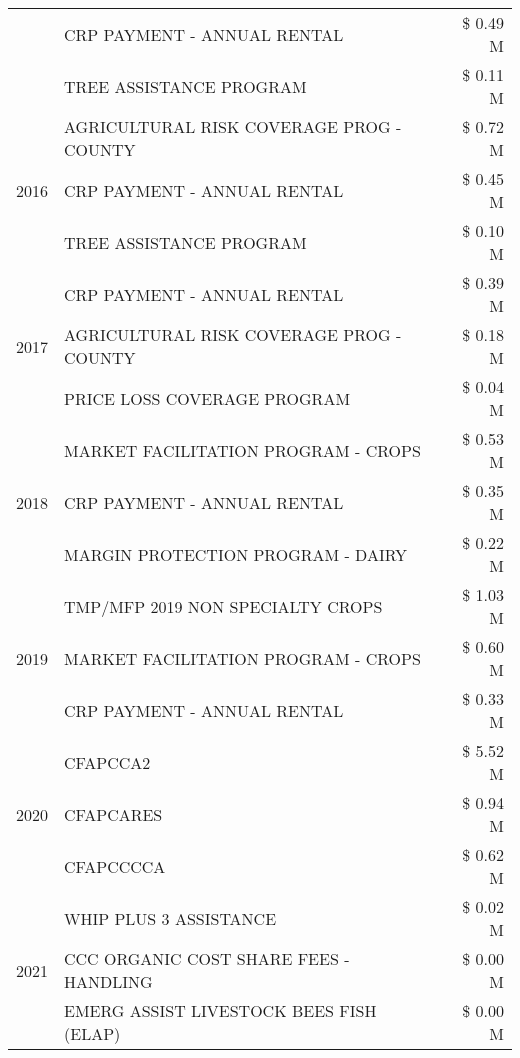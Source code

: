 \begin{tabular}{llr}
 & CRP PAYMENT - ANNUAL RENTAL & \$ 0.49 M \\
 & TREE ASSISTANCE PROGRAM & \$ 0.11 M \\
\cline{1-3}
\multirow[t]{3}{*}{2016} & AGRICULTURAL RISK COVERAGE PROG - COUNTY & \$ 0.72 M \\
 & CRP PAYMENT - ANNUAL RENTAL & \$ 0.45 M \\
 & TREE ASSISTANCE PROGRAM & \$ 0.10 M \\
\cline{1-3}
\multirow[t]{3}{*}{2017} & CRP PAYMENT - ANNUAL RENTAL & \$ 0.39 M \\
 & AGRICULTURAL RISK COVERAGE PROG - COUNTY & \$ 0.18 M \\
 & PRICE LOSS COVERAGE PROGRAM & \$ 0.04 M \\
\cline{1-3}
\multirow[t]{3}{*}{2018} & MARKET FACILITATION PROGRAM - CROPS & \$ 0.53 M \\
 & CRP PAYMENT - ANNUAL RENTAL & \$ 0.35 M \\
 & MARGIN PROTECTION PROGRAM - DAIRY & \$ 0.22 M \\
\cline{1-3}
\multirow[t]{3}{*}{2019} & TMP/MFP 2019 NON SPECIALTY CROPS & \$ 1.03 M \\
 & MARKET FACILITATION PROGRAM - CROPS & \$ 0.60 M \\
 & CRP PAYMENT - ANNUAL RENTAL & \$ 0.33 M \\
\cline{1-3}
\multirow[t]{3}{*}{2020} & CFAPCCA2 & \$ 5.52 M \\
 & CFAPCARES & \$ 0.94 M \\
 & CFAPCCCCA & \$ 0.62 M \\
\cline{1-3}
\multirow[t]{3}{*}{2021} & WHIP PLUS 3 ASSISTANCE & \$ 0.02 M \\
 & CCC ORGANIC COST SHARE FEES - HANDLING & \$ 0.00 M \\
 & EMERG ASSIST LIVESTOCK BEES FISH (ELAP) & \$ 0.00 M \\
\cline{1-3}
\bottomrule
\end{tabular}
